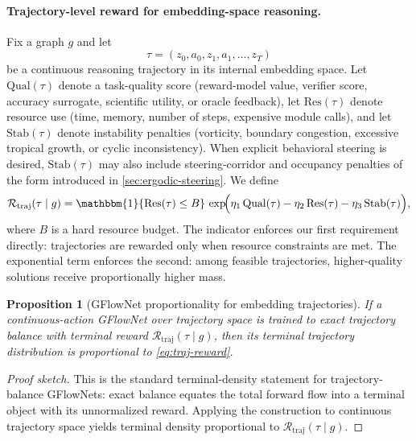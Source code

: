\documentclass[11pt]{article}
\theoremstyle{definition}
\theoremstyle{plain}
\newtheorem{proposition}{Proposition}[section]
\theoremstyle{remark}
\newcommand{\mc}[1]{\mathcal{#1}}
\newcommand{\Reward}{\mc{R}}
\begin{document}
\paragraph{Trajectory-level reward for embedding-space reasoning.}
Fix a graph $g$ and let
\[
\tau=(z_0,a_0,z_1,a_1,\dots,z_T)
\]
be a continuous reasoning trajectory in its internal embedding space.
Let $\mathrm{Qual}(\tau)$ denote a task-quality score (reward-model value, verifier score, accuracy surrogate, scientific utility, or oracle feedback), let $\mathrm{Res}(\tau)$ denote resource use (time, memory, number of steps, expensive module calls), and let $\mathrm{Stab}(\tau)$ denote instability penalties (vorticity, boundary congestion, excessive tropical growth, or cyclic inconsistency).
When explicit behavioral steering is desired, $\mathrm{Stab}(\tau)$ may also include steering-corridor and occupancy penalties of the form introduced in \cref{sec:ergodic-steering}.
We define
\begin{equation}
\Reward_{\mathrm{traj}}(\tau\mid g)
=
\mathbbm{1}\{\mathrm{Res}(\tau)\le B\}\,
\exp\!\Bigl(
\eta_1 \,\mathrm{Qual}(\tau)
-\eta_2 \,\mathrm{Res}(\tau)
-\eta_3 \,\mathrm{Stab}(\tau)
\Bigr),
\label{eq:traj-reward}
\end{equation}
where $B$ is a hard resource budget.
The indicator enforces our first requirement directly:
trajectories are rewarded only when resource constraints are met.
The exponential term enforces the second:
among feasible trajectories, higher-quality solutions receive proportionally higher mass.

\begin{proposition}[GFlowNet proportionality for embedding trajectories]
If a continuous-action GFlowNet over trajectory space is trained to exact trajectory balance with terminal reward $\Reward_{\mathrm{traj}}(\tau\mid g)$, then its terminal trajectory distribution is proportional to \eqref{eq:traj-reward}.
\end{proposition}

\begin{proof}[Proof sketch]
This is the standard terminal-density statement for trajectory-balance GFlowNets: exact balance equates the total forward flow into a terminal object with its unnormalized reward. Applying the construction to continuous trajectory space yields terminal density proportional to $\Reward_{\mathrm{traj}}(\tau\mid g)$.
\end{proof}
\end{document}
